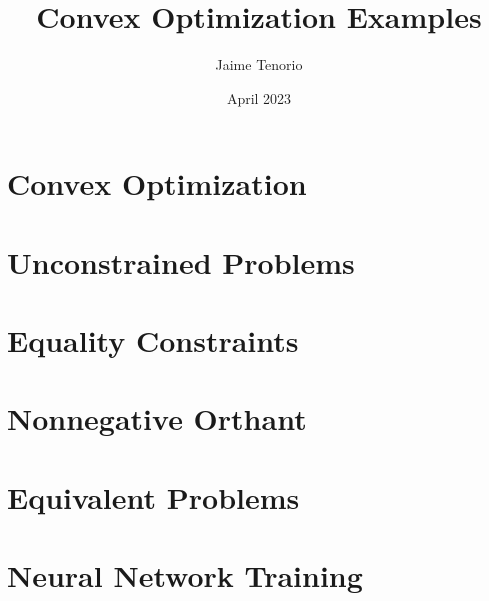 \documentclass{article}
\title{Convex Optimization Examples}
\author{Jaime Tenorio}
\date{April 2023}
\begin{document}
\maketitle

\section{Convex Optimization}




\section{Unconstrained Problems}




\section{Equality Constraints}




\section{Nonnegative Orthant}




\section{Equivalent Problems}

%


\section{Neural Network Training}





\end{document}

